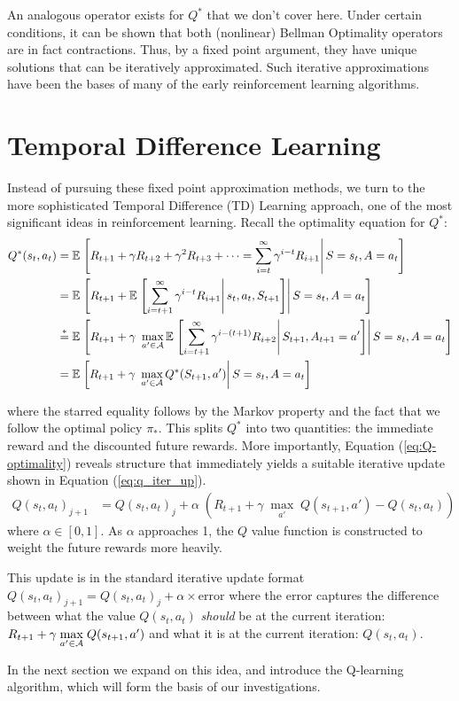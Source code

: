 An analogous operator exists for $Q^*$ that we don't cover here. Under certain conditions, it can be shown that both (nonlinear) Bellman Optimality operators are in fact contractions. Thus, by a fixed point argument, they have unique solutions that can be iteratively approximated. Such iterative approximations have been the bases of many of the early reinforcement learning algorithms. 

\section{Temporal Difference Learning}\label{sec5}
Instead of pursuing these fixed point approximation methods, we turn to the more sophisticated Temporal Difference (TD) Learning approach, one of the most significant ideas in reinforcement learning. Recall the optimality equation for $Q^*$:
\begin{align}
Q^*(s_t, a_t) &= \mathbb{E}\left.\left[R_{t+1} + \gamma R_{t+2} +
\gamma^2 R_{t+3} + \cdots = \sum_{i=t}^{\infty} \gamma^{i-t}R_{i+1}
\right| S = s_t, A = a_t \right] \\
&= \mathbb{E}\left.\left[R_{t+1} + \mathbb{E}\left.\left[ \sum_{i=t + 1}^{\infty} \gamma^{i-t}R_{i+1}
\right| s_t, a_t, S_{t+1} \right] \right| S = s_t, A = a_t \right] \nonumber \\
&\stackrel{*}{=} \mathbb{E}\left.\left[R_{t+1} + \gamma\ \max\limits_{a' \in \mathcal{A}} \mathbb{E}\left.\left[ \sum_{i=t + 1}^{\infty} \gamma^{i-(t + 1)}R_{i+2}
\right| S_{t+1}, A_{t+1}=a' \right] \right| S = s_t, A = a_t \right] \nonumber \\
&= \mathbb{E}\left.\left[R_{t+1} + \gamma\ \max\limits_{a' \in \mathcal{A}} Q^*(S_{t+1},a') \right| S = s_t, A = a_t \right] \label{eq:Q-optimality}
\end{align}

where the starred equality follows by the Markov property and the fact that we follow the optimal policy $\pi_*$. This splits $Q^*$ into two quantities: the immediate reward and the discounted
future rewards. More importantly,
Equation (\ref{eq:Q-optimality}) reveals structure that 
immediately yields a suitable iterative update shown in Equation (\ref{eq:q_iter_up}).
\begin{align}\label{eq:q_iter_up}
Q(s_t, a_t)_{j+1} &= Q(s_t, a_t)_j + \alpha \;
\left(R_{t+1} + \gamma \; \underset{a'}\max \; Q(s_{t+1},a') - Q(s_t, a_t)\right)
\end{align}
where $\alpha \in [0, 1]$. As $\alpha$ approaches 1, 
the $Q$ value function is constructed to weight the 
future rewards more heavily. 

This update is in the standard iterative update format
$Q(s_t, a_t)_{j+1} = Q(s_t, a_t)_j + \alpha \times \textrm{error} $ where
the error captures the difference between what the value $Q(s_t, a_t)$ 
\textit{should} 
be at the current iteration: $R_{t+1} + \gamma \; \underset{a' \in \mathcal{A}}\max \; Q(s_{t+1},a')$ 
and what it is at the current iteration: $Q(s_t, a_t)$. 

In the next section we expand on this idea, and introduce the Q-learning algorithm, which will form the basis of our investigations. 
\endinput


